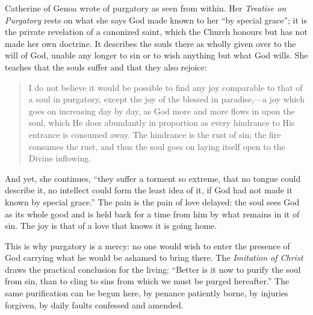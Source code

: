 Catherine of Genoa wrote of purgatory as seen from within. Her \emph{Treatise on Purgatory} rests on what she says God made known to her ``by special grace''; it is the private revelation of a canonized saint, which the Church honours but has not made her own doctrine. It describes the souls there as wholly given over to the will of God, unable any longer to sin or to wish anything but what God wills. She teaches that the souls suffer and that they also rejoice:

\begin{quote}
I do not believe it would be possible to find any joy comparable to that of a soul in purgatory, except the joy of the blessed in paradise,---a joy which goes on increasing day by day, as God more and more flows in upon the soul, which He does abundantly in proportion as every hindrance to His entrance is consumed away. The hindrance is the rust of sin; the fire consumes the rust, and thus the soul goes on laying itself open to the Divine inflowing.
\end{quote}

And yet, she continues, ``they suffer a torment so extreme, that no tongue could describe it, no intellect could form the least idea of it, if God had not made it known by special grace.'' The pain is the pain of love delayed: the soul sees God as its whole good and is held back for a time from him by what remains in it of sin. The joy is that of a love that knows it is going home.

This is why purgatory is a mercy: no one would wish to enter the presence of God carrying what he would be ashamed to bring there. The \emph{Imitation of Christ} draws the practical conclusion for the living: ``Better is it now to purify the soul from sin, than to cling to sins from which we must be purged hereafter.'' The same purification can be begun here, by penance patiently borne, by injuries forgiven, by daily faults confessed and amended.
